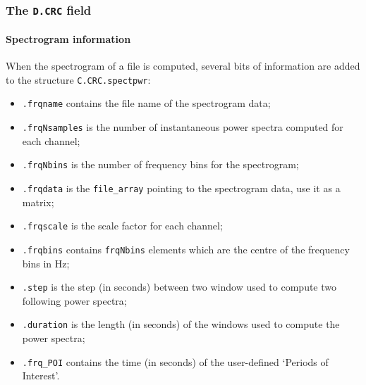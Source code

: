\documentclass[a4paper,titlepage]{article}
\newcommand{\bi}{\begin{itemize}}
\newcommand{\ei}{\end{itemize}}
\begin{document}
\subsubsection{The {\tt D.CRC} field}
\paragraph{Spectrogram information}
When the spectrogram of a file is computed, several bits of information are added to the structure {\tt C.CRC.spectpwr}:
\bi
\item {\tt .frqname} contains the file name of the spectrogram data;
\item {\tt .frqNsamples} is the number of instantaneous power spectra computed for each channel;
\item {\tt .frqNbins} is the number of frequency bins for the spectrogram;
\item {\tt .frqdata} is the {\tt file\_array} pointing to the spectrogram data, use it as a matrix;
\item {\tt .frqscale} is the scale factor for each channel;
\item {\tt .frqbins} contains {\tt frqNbins} elements which are the centre of the frequency bins in Hz;
\item {\tt .step} is the step (in seconds) between two window used to compute two following power spectra;
\item {\tt .duration} is the length (in seconds) of the windows used to compute the power spectra;
\item {\tt .frq\_POI} contains the time (in seconds) of the user-defined `Periods of Interest'.
\ei
\end{document}
